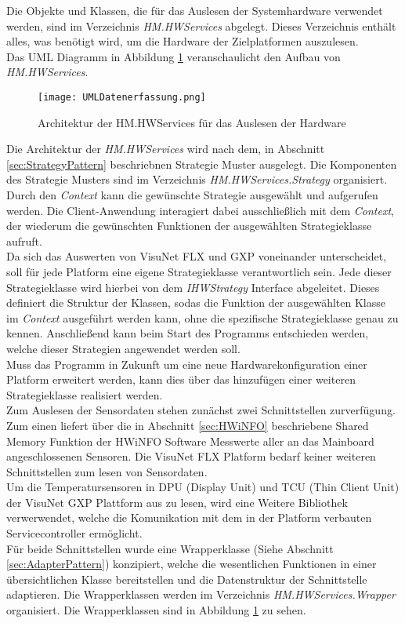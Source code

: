 Die Objekte und Klassen, die für das Auslesen der Systemhardware verwendet werden, sind im Verzeichnis \textit{HM.HWServices} abgelegt. Dieses Verzeichnis enthält alles, was benötigt wird, um die Hardware der Zielplatformen auszulesen.\\
Das UML Diagramm in Abbildung \ref{fig:HWServicesUML} veranschaulicht den Aufbau von \textit{HM.HWServices}. 
\begin{center}
    \begin{figure}[h!]
        \centering
        \texttt{[image: UMLDatenerfassung.png]}
        \caption{Architektur der HM.HWServices für das Auslesen der Hardware}
        \label{fig:HWServicesUML}
    \end{figure}
\end{center}
\vspace{-1.8cm}
Die Architektur der \textit{HM.HWServices} wird nach dem, in Abschnitt \ref{sec:StrategyPattern} beschriebnen Strategie Muster ausgelegt.
Die Komponenten des Strategie Musters sind im Verzeichnis \textit{HM.HWServices.Strategy} organisiert.\\
Durch den \textit{Context} kann die gewünschte Strategie ausgewählt und aufgerufen werden. Die Client-Anwendung interagiert dabei ausschließlich mit dem \textit{Context}, der wiederum die gewünschten Funktionen der ausgewählten Strategieklasse aufruft.\\  
Da sich das Auswerten von VisuNet FLX und GXP voneinander unterscheidet, soll für jede Platform eine eigene Strategieklasse verantwortlich sein. Jede dieser Strategieklasse wird hierbei von dem \textit{IHWStrategy} Interface abgeleitet. Dieses definiert die Struktur der Klassen, sodas die Funktion der ausgewählten Klasse im \textit{Context} ausgeführt werden kann, ohne die spezifische Strategieklasse genau zu kennen. Anschließend kann beim Start des Programms entschieden werden, welche dieser Strategien angewendet werden soll.\\
Muss das Programm in Zukunft um eine neue Hardwarekonfiguration einer Platform erweitert werden, kann dies über das hinzufügen einer weiteren Strategieklasse realisiert werden.\\
Zum Auslesen der Sensordaten stehen zunächst zwei Schnittstellen zurverfügung. Zum einen liefert über die in Abschnitt \ref{sec:HWiNFO} beschriebene Shared Memory Funktion der HWiNFO Software Messwerte aller an das Mainboard angeschlossenen Sensoren. Die VisuNet FLX Platform bedarf keiner weiteren Schnittstellen zum lesen von Sensordaten.\\
Um die Temperatursensoren in DPU (Display Unit) und TCU (Thin Client Unit) der VisuNet GXP Plattform aus zu lesen, wird eine Weitere Bibliothek verwerwendet, welche die Komunikation mit dem in der Platform verbauten Servicecontroller ermöglicht.\\
Für beide Schnittstellen wurde eine Wrapperklasse (Siehe Abschnitt \ref{sec:AdapterPattern}) konzipiert, welche die wesentlichen Funktionen in einer übersichtlichen Klasse bereitstellen und die Datenstruktur der Schnittstelle adaptieren. Die Wrapperklassen werden im Verzeichnis \textit{HM.HWServices.Wrapper} organisiert. Die Wrapperklassen sind in Abbildung \ref{fig:HWServicesUML} zu sehen.
